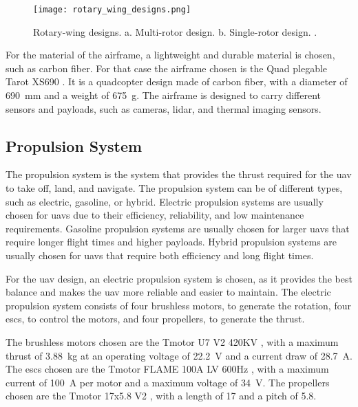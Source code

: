 \begin{figure}
  \texttt{[image: rotary\_wing\_designs.png]}
  \caption{Rotary-wing designs. a. Multi-rotor design. b. Single-rotor design. \autocite{rotary_wing_designs}.}\label{fig:rotary_wing_designs}
\end{figure}

For the material of the airframe, a lightweight and durable material is chosen, such as carbon fiber. For that case the airframe chosen is the Quad plegable Tarot XS690 \autocite{rcinnovationsQuadPlegable}. It is a quadcopter design made of carbon fiber, with a diameter of \SI{690}{\milli\meter} and a weight of \SI{675}{\gram}. The airframe is designed to carry different sensors and payloads, such as cameras, lidar, and thermal imaging sensors.

\subsection{Propulsion System}\label{subsec:design_propulsion_system}

The propulsion system is the system that provides the thrust required for the \gls{uav} to take off, land, and navigate. The propulsion system can be of different types, such as electric, gasoline, or hybrid. Electric propulsion systems are usually chosen for \glspl{uav} due to their efficiency, reliability, and low maintenance requirements. Gasoline propulsion systems are usually chosen for larger \glspl{uav} that require longer flight times and higher payloads. Hybrid propulsion systems are usually chosen for \glspl{uav} that require both efficiency and long flight times.

For the \gls{uav} design, an electric propulsion system is chosen, as it provides the best balance and makes the \gls{uav} more reliable and easier to maintain. The electric propulsion system consists of four brushless motors, to generate the rotation, four \glspl{esc}, to control the motors, and four propellers, to generate the thrust.

The brushless motors chosen are the Tmotor U7 V2 420KV \autocite{rcinnovationsTmotor420KV}, with a maximum thrust of \SI{3.88}{\kilo\gram} at an operating voltage of \SI{22.2}{\volt} and a current draw of \SI{28.7}{\ampere}. The \glspl{esc} chosen are the Tmotor FLAME 100A LV 600Hz \autocite{rcinnovationsVariadorTmotor}, with a maximum current of \SI{100}{\ampere} per motor and a maximum voltage of \SI{34}{\volt}. The propellers chosen are the Tmotor 17x5.8 V2 \autocite{rcinnovationsTmotor17x58}, with a length of \SI{17}{\inch} and a pitch of \SI{5.8}{\inch}.

